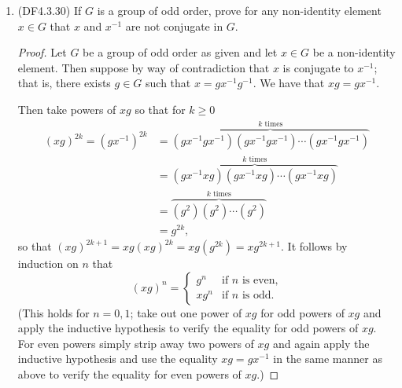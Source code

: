 \documentclass[11pt]{article}
\begin{document}
\begin{enumerate}
\begin{proof}
      Therefore the elements in $\mathcal{K}_{\sigma}$ and $\mathcal{K}_{\sigma^{\prime}}$ do not commute with odd permutations (if they did then conjugation of an element in one conjugacy class by an odd permutation would not return an element in the other conjugacy class). Hence any element in $\mathcal{K}$ does not commute with any odd permutation, and by the previous result, $\mathcal{K}$ consists of elements whose cycle type is distinct odd integers.

      Hence $\mathcal{K}$ consists of two conjugacy classes in $A_n$ if and only if the cycle type of an element of $\mathcal{K}$ consists of distinct odd integers.
    \end{proof}
    \item (DF4.3.30) If $G$ is a group of odd order, prove for any non-identity element $x\in G$ that $x$ and $x^{-1}$ are not conjugate in $G$.
    \begin{proof}
      Let $G$ be a group of odd order as given and let $x\in G$ be a non-identity element. Then suppose by way of contradiction that $x$ is conjugate to $x^{-1}$; that is, there exists $g\in G$ such that $x = gx^{-1}g^{-1}$. We have that $xg = gx^{-1}$.

      Then take powers of $xg$ so that for $k\geq 0$ \begin{align*}
        (xg)^{2k} = (gx^{-1})^{2k} &= \overbrace{(gx^{-1}gx^{-1}) (gx^{-1}gx^{-1}) \cdots (gx^{-1}gx^{-1})}^{k \text{ times}} \\ 
        &= \overbrace{(gx^{-1}xg) (gx^{-1}xg) \cdots (gx^{-1}xg)}^{k \text{ times}} \\ 
        &= \overbrace{(g^2) (g^2) \cdots(g^2)}^{k \text{ times}}\\
        &= g^{2k},
      \end{align*} so that $(xg)^{2k+1} = xg (xg)^{2k} = xg (g^{2k}) = xg^{2k+1}$. It follows by induction on $n$ that \[(xg)^n = \begin{cases}
        g^n & \text{if $n$ is even,}\\
        xg^n & \text{if $n$ is odd.}
      \end{cases}\]
      (This holds for $n = 0,1$; take out one power of $xg$ for odd powers of $xg$ and apply the inductive hypothesis to verify the equality for odd powers of $xg$. For even powers simply strip away two powers of $xg$ and again apply the inductive hypothesis and use the equality $xg = gx^{-1}$ in the same manner as above to verify the equality for even powers of $xg$.)


\end{proof}
\end{enumerate}
\end{document}
